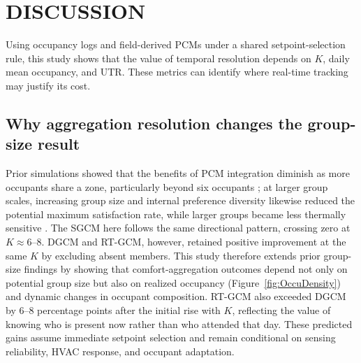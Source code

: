 \section{DISCUSSION}
Using occupancy logs and field-derived PCMs under a shared setpoint-selection rule, this study shows that the value of temporal resolution depends on $K$, daily mean occupancy, and UTR.
These metrics can identify where real-time tracking may justify its cost.

\subsection{Why aggregation resolution changes the group-size result}
Prior simulations showed that the benefits of PCM integration diminish as more occupants share a zone, particularly beyond six occupants \parencite{jung_energy_2020}; at larger group scales, increasing group size and internal preference diversity likewise reduced the potential maximum satisfaction rate, while larger groups became less thermally sensitive \parencite{wang_enhancing_2026}.
The SGCM here follows the same directional pattern, crossing zero at $K\approx6$--8.
DGCM and RT-GCM, however, retained positive improvement at the same $K$ by excluding absent members.
This study therefore extends prior group-size findings by showing that comfort-aggregation outcomes depend not only on potential group size but also on realized occupancy (Figure~\ref{fig:OccuDensity}) and dynamic changes in occupant composition.
RT-GCM also exceeded DGCM by 6--8 percentage points after the initial rise with $K$, reflecting the value of knowing who is present now rather than who attended that day.
These predicted gains assume immediate setpoint selection and remain conditional on sensing reliability, HVAC response, and occupant adaptation.


